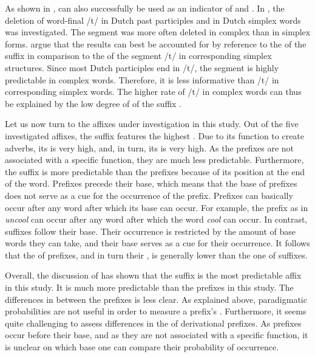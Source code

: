 {{As shown in \cite{Hanique.06.03.2013},  can also successfully be used as an indicator of  and . In \cite{Hanique.06.03.2013}, the deletion of word-final /t/ in Dutch past participles and in Dutch simplex words was investigated.  The segment was more often deleted in complex than in simplex forms. 
  \cite{Hanique.2012}  argue that the results can best be accounted for by reference to the  of the suffix  in comparison to the  of the segment /t/ in corresponding simplex structures. Since most Dutch participles end in /t/, the segment is highly predictable in complex words. Therefore, it is less informative than /t/ in corresponding simplex words. The higher  rate of /t/ in complex words can thus be explained by the low degree of  of the suffix .
  
  
Let us now turn to the affixes under investigation in this study. Out of the five investigated affixes, the suffix  features the highest . Due to its function to create adverbs, its  is very high, and, in turn, its  is very high. As the prefixes are not associated with a specific function, they are much less predictable.  
Furthermore, the suffix  is more predictable than the prefixes because of its position at the end of the word. 
 Prefixes precede their base, which means that the base of prefixes does not serve as a cue for the occurrence of the prefix. Prefixes can basically occur after any word after which its base can occur. 
 For example, the prefix  as in \textit{uncool} can occur after any word after which the word \textit{cool} can occur. 
 In contrast, suffixes follow their base. Their occurrence is restricted by the amount of base words they can take,  and their base serves as a cue for their occurrence.
 It follows that the  of prefixes, and in turn their , is generally lower than the one of suffixes. 
 
Overall, the discussion of  has shown that the suffix  is the most predictable affix in this study. It is much more predictable than the prefixes in this study. The differences in  between the prefixes is less clear. As explained above, paradigmatic probabilities are not useful in order to measure a prefix's . Furthermore, it seems quite challenging to assess differences in the  of derivational prefixes. As prefixes occur before their base, and as they are not associated with a specific function, it is unclear on which base one can compare their probability of occurrence.




}}
